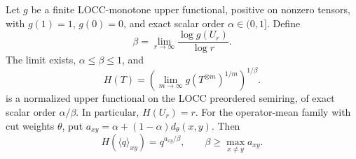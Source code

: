 \begin{proposition}\label{prop:ghz-growth-normalization}
Let \(g\) be a finite LOCC-monotone upper functional, positive on nonzero tensors, with \(g(1)=1\), \(g(0)=0\), and exact scalar order \(\alpha\in(0,1]\).  Define
\[
 \beta=\lim_{r\longrightarrow\infty}
       \frac{\log g(U_r)}{\log r}.
\]
The limit exists, \(\alpha\leq\beta\leq1\), and
\begin{equation}\label{eq:ghz-growth-normalization}
 H(T)=\left(\lim_{m\longrightarrow\infty}g(T^{\otimes m})^{1/m}\right)^{1/\beta}.
\end{equation}
is a normalized upper functional on the LOCC preordered semiring, of exact scalar order \(\alpha/\beta\).  In particular, \(H(U_r)=r\).
For the operator-mean family with cut weights \(\theta\), put
\(a_{xy}=\alpha+(1-\alpha)d_\theta(x,y)\).  Then
\[
 H(\langle q\rangle_{xy})=q^{a_{xy}/\beta},
 \qquad \beta\geq\max_{x\ne y}a_{xy}.
\]
\end{proposition}

